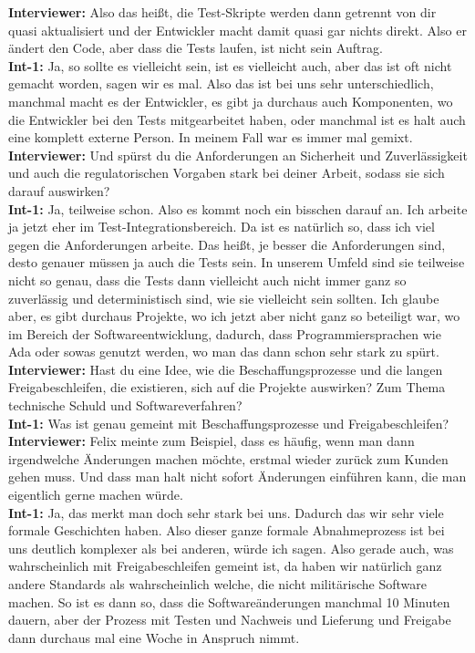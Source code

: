 \textbf{Interviewer:} Also das heißt, die Test-Skripte werden dann getrennt von dir quasi aktualisiert und der Entwickler macht damit quasi gar nichts direkt. Also er ändert den Code, aber dass die Tests laufen, ist nicht sein Auftrag.\\
\textbf{Int-1:} Ja, so sollte es vielleicht sein, ist es vielleicht auch, aber das ist oft nicht gemacht worden, sagen wir es mal. Also das ist bei uns sehr unterschiedlich, manchmal macht es der Entwickler, es gibt ja durchaus auch Komponenten, wo die Entwickler bei den Tests mitgearbeitet haben, oder manchmal ist es halt auch eine komplett externe Person. In meinem Fall war es immer mal gemixt.\\
\textbf{Interviewer:} Und spürst du die Anforderungen an Sicherheit und Zuverlässigkeit und auch die regulatorischen Vorgaben stark bei deiner Arbeit, sodass sie sich darauf auswirken?\\
\textbf{Int-1:} Ja, teilweise schon. Also es kommt noch ein bisschen darauf an. Ich arbeite ja jetzt eher im Test-Integrationsbereich. Da ist es natürlich so, dass ich viel gegen die Anforderungen arbeite. Das heißt, je besser die Anforderungen sind, desto genauer müssen ja auch die Tests sein. In unserem Umfeld sind sie teilweise nicht so genau, dass die Tests dann vielleicht auch nicht immer ganz so zuverlässig und deterministisch sind, wie sie vielleicht sein sollten. Ich glaube aber, es gibt durchaus Projekte, wo ich jetzt aber nicht ganz so beteiligt war, wo im Bereich der Softwareentwicklung, dadurch, dass Programmiersprachen wie Ada oder sowas genutzt werden, wo man das dann schon sehr stark zu spürt.\\
\textbf{Interviewer:} Hast du eine Idee, wie die Beschaffungsprozesse und die langen Freigabeschleifen, die existieren, sich auf die Projekte auswirken? Zum Thema technische Schuld und Softwareverfahren?\\
\textbf{Int-1:} Was ist genau gemeint mit Beschaffungsprozesse und Freigabeschleifen?\\
\textbf{Interviewer:} Felix meinte zum Beispiel, dass es häufig, wenn man dann irgendwelche Änderungen machen möchte, erstmal wieder zurück zum Kunden gehen muss. Und dass man halt nicht sofort Änderungen einführen kann, die man eigentlich gerne machen würde.\\
\textbf{Int-1:} Ja, das merkt man doch sehr stark bei uns. Dadurch das wir sehr viele formale Geschichten haben. Also dieser ganze formale Abnahmeprozess ist bei uns deutlich komplexer als bei anderen, würde ich sagen. Also gerade auch, was wahrscheinlich mit Freigabeschleifen gemeint ist, da haben wir natürlich ganz andere Standards als wahrscheinlich welche, die nicht militärische Software machen. So ist es dann so, dass die Softwareänderungen manchmal 10 Minuten dauern, aber der Prozess mit Testen und Nachweis und Lieferung und Freigabe dann durchaus mal eine Woche in Anspruch nimmt.\\

